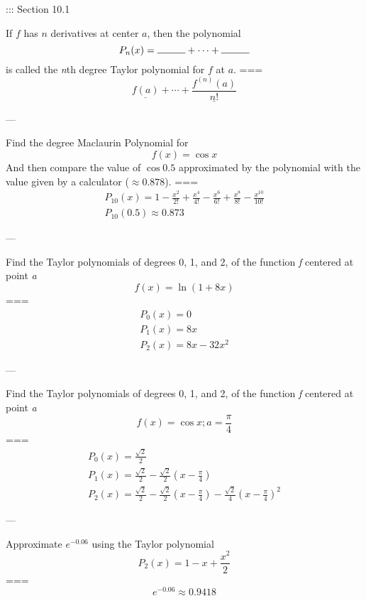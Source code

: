 ::: Section 10.1


If \(f\) has \(n\) derivatives at center \(a\), then the polynomial
\[P_n(x)=\rule{1cm}{0.15mm}+\cdots+\rule{1cm}{0.15mm}\]
is called the \textit{n}th degree Taylor polynomial for \(f\) at \(a\).
===
\[\underline{f(a)}+\cdots+\underline{\frac{f^{(n)}(a)}{n!}}\]

---

Find the  degree Maclaurin Polynomial for
\[f(x)=\cos x\]
And then compare the value of \(\cos 0.5\) approximated by the polynomial with
the value given by a calculator (\(\approx 0.878\)).
===
\begin{gather*}
  P_{10}(x)=1-\frac{x^2}{2!}+\frac{x^4}{4!}-
  \frac{x^6}{6!}+\frac{x^8}{8!}-\frac{x^{10}}{10!}\\

  P_{10}(0.5)\approx 0.873
\end{gather*}

---


Find the Taylor polynomials of degrees 0, 1, and 2, of the function \textit{f}
centered at point \textit{a}
\[f(x)=\ln(1+8x)\]
===
\begin{gather*}
  P_0(x)=0 \\
  P_1(x)=8x \\
  P_2(x)=8x-32x^2
\end{gather*}

---

Find the Taylor polynomials of degrees 0, 1, and 2, of the function \textit{f}
centered at point \textit{a}
\[f(x)=\cos x; a=\frac{\pi}{4}\]
===
\begin{gather*}
  P_0(x)=\frac{\sqrt{2}}{2}\\
  P_1(x)=\frac{\sqrt{2}}{2}-\frac{\sqrt{2}}{2}\left(x-\frac{\pi}{4}\right)\\
  P_2(x)=
  \frac{\sqrt{2}}{2}-
  \frac{\sqrt{2}}{2}\left(x-\frac{\pi}{4}\right)-
  \frac{\sqrt{2}}{4}{\left(x-\frac{\pi}{4}\right)}^2
\end{gather*}

---

Approximate \(e^{-0.06}\) using the Taylor polynomial
\[P_2(x)=1-x+\frac{x^2}{2}\]
===
\[e^{-0.06}\approx 0.9418\]

